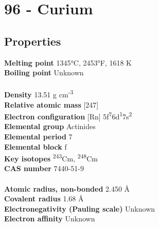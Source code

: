 \section{96 - Curium}
\label{sec:elem-curium}
\subsection{Properties}
\textbf{Melting point} 1345°C, 2453°F, 1618 K\\
\textbf{Boiling point} Unknown\\
\\
\textbf{Density} 13.51 g cm\textsuperscript{-3}\\
\textbf{Relative atomic mass} [247]\\
\textbf{Electron configuration} [Rn] 5f\textsuperscript{7}6d\textsuperscript{1}7s\textsuperscript{2}\\
\textbf{Elemental group} Actinides\\
\textbf{Elemental period} 7\\
\textbf{Elemental block} f\\
\textbf{Key isotopes} \textsuperscript{243}Cm, \textsuperscript{248}Cm\\
\textbf{CAS number} 7440-51-9\\
\\
\textbf{Atomic radius, non-bonded} 2.450 Å\\
\textbf{Covalent radius} 1.68 Å\\
\textbf{Electronegativity (Pauling scale)} Unknown\\
\textbf{Electron affinity} Unknown\\